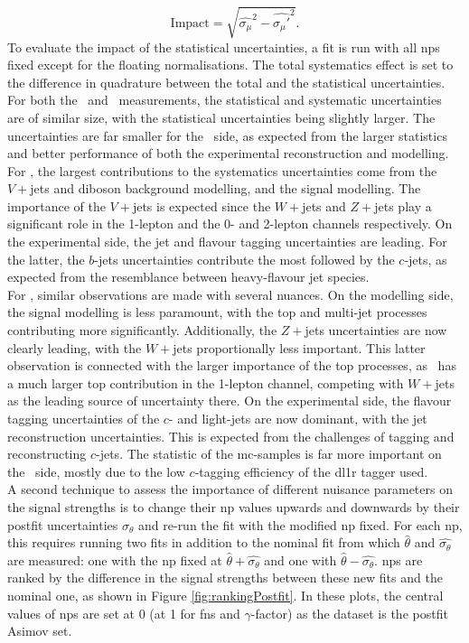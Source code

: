 \begin{equation}
    \text{Impact} = \sqrt{\hat{\sigma_{\mu}}^2 - \hat{\sigma_{\mu}'}^2}.
\end{equation}
To evaluate the impact of the statistical uncertainties, a fit is run with all \glspl{np} fixed except for the floating normalisations. The total systematics effect is set to the difference in quadrature between the total and the statistical uncertainties. For both the \vhb\ and \vhc\ measurements, the statistical and systematic uncertainties are of similar size, with the statistical uncertainties being slightly larger. The uncertainties are far smaller for the \vhb\ side, as expected from the larger statistics and better performance of both the experimental reconstruction and modelling. For \vhb, the largest contributions to the systematics uncertainties come from the $V+$jets and diboson background modelling, and the signal modelling. The importance of the $V+$jets is expected since the $W+$jets and $Z+$jets play a significant role in the 1-lepton and the 0- and 2-lepton channels respectively. On the experimental side, the jet and flavour tagging uncertainties are leading. For the latter, the $b$-jets uncertainties contribute the most followed by the $c$-jets, as expected from the resemblance between heavy-flavour jet species. \\

For \vhc, similar observations are made with several nuances. On the modelling side, the signal modelling is less paramount, with the top and multi-jet processes contributing more significantly. Additionally, the $Z+$jets uncertainties are now clearly leading, with the $W+$jets proportionally less important. This latter observation is connected with the larger importance of the top processes, as \vhc\ has a much larger top contribution in the 1-lepton channel, competing with $W+$jets as the leading source of uncertainty there. On the experimental side, the flavour tagging uncertainties of the $c$- and light-jets are now dominant, with the jet reconstruction uncertainties. This is expected from the challenges of tagging and reconstructing $c$-jets. The statistic of the \gls{mc}-samples is far more important on the \vhc\ side, mostly due to the low $c$-tagging efficiency of the \gls{dl1r} tagger used. \\

A second technique to assess the importance of different nuisance parameters on the signal strengths is to change their \gls{np} values upwards and downwards by their postfit uncertainties $\sigma_{\theta}$ and re-run the fit with the modified \gls{np} fixed. For each \gls{np}, this requires running two fits in addition to the nominal fit from which $\hat{\theta}$ and $\hat{\sigma_{\theta}}$ are measured: one with the \gls{np} fixed at $\hat{\theta} + \hat{\sigma_{\theta}}$ and one with $\hat{\theta} - \hat{\sigma_{\theta}}$. \glspl{np} are ranked by the difference in the signal strengths between these new fits and the nominal one, as shown in Figure \ref{fig:rankingPostfit}. In these plots, the central values of \glspl{np} are set at 0 (at 1 for \glspl{fn} and $\gamma$-factor) as the dataset is the postfit Asimov set. \\

